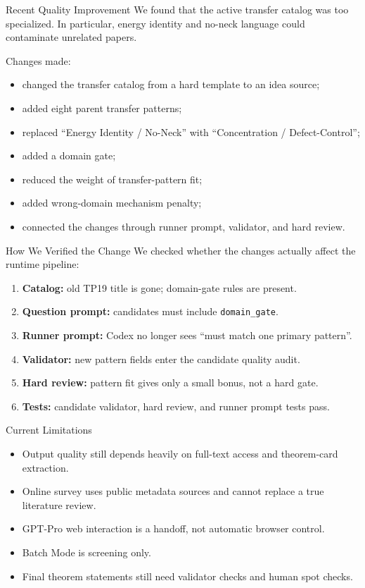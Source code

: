 \documentclass[aspectratio=169,11pt]{beamer}
\begin{document}
\begin{frame}{Recent Quality Improvement}
  We found that the active transfer catalog was too specialized. In particular, energy identity and no-neck language could contaminate unrelated papers.

  \vspace{0.5em}
  Changes made:
  \begin{itemize}
    \item changed the transfer catalog from a hard template to an idea source;
    \item added eight parent transfer patterns;
    \item replaced ``Energy Identity / No-Neck'' with ``Concentration / Defect-Control'';
    \item added a domain gate;
    \item reduced the weight of transfer-pattern fit;
    \item added wrong-domain mechanism penalty;
    \item connected the changes through runner prompt, validator, and hard review.
  \end{itemize}
\end{frame}

\begin{frame}{How We Verified the Change}
  We checked whether the changes actually affect the runtime pipeline:

  \begin{enumerate}
    \item \textbf{Catalog:} old TP19 title is gone; domain-gate rules are present.
    \item \textbf{Question prompt:} candidates must include \texttt{domain\_gate}.
    \item \textbf{Runner prompt:} Codex no longer sees ``must match one primary pattern''.
    \item \textbf{Validator:} new pattern fields enter the candidate quality audit.
    \item \textbf{Hard review:} pattern fit gives only a small bonus, not a hard gate.
    \item \textbf{Tests:} candidate validator, hard review, and runner prompt tests pass.
  \end{enumerate}
\end{frame}

\begin{frame}{Current Limitations}
  \begin{itemize}
    \item Output quality still depends heavily on full-text access and theorem-card extraction.
    \item Online survey uses public metadata sources and cannot replace a true literature review.
    \item GPT-Pro web interaction is a handoff, not automatic browser control.
    \item Batch Mode is screening only.
    \item Final theorem statements still need validator checks and human spot checks.
  \end{itemize}
\end{frame}
\end{document}

